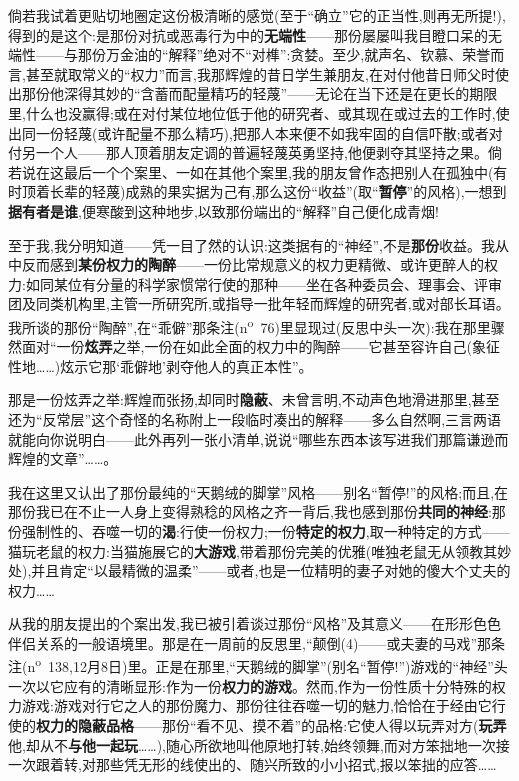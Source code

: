 倘若我试着更贴切地圈定这份极清晰的感觉(至于“确立”它的正当性,则再无所提!),得到的是这个:是那份对抗或恶毒行为中的\textbf{无端性}——那份屡屡叫我目瞪口呆的无端性——与那份万金油的“解释”绝对不“对榫”:贪婪。至少,就声名、钦慕、荣誉而言,甚至就取常义的“权力”而言,我那辉煌的昔日学生兼朋友,在对付他昔日师父时使出那份他深得其妙的“含蓄而配量精巧的轻蔑”——无论在当下还是在更长的期限里,什么也没赢得;或在对付某位地位低于他的研究者、或其现在或过去的工作时,使出同一份轻蔑(或许配量不那么精巧),把那人本来便不如我牢固的自信吓散;或者对付另一个人——那人顶着朋友定调的普遍轻蔑英勇坚持,他便剥夺其坚持之果。倘若说在这最后一个个案里、一如在其他个案里,我的朋友曾作态把别人在孤独中(有时顶着长辈的轻蔑)成熟的果实据为己有,那么这份“收益”(取“\textbf{暂停}”的风格),一想到\textbf{据有者是谁},便寒酸到这种地步,以致那份端出的“解释”自己便化成青烟!

至于我,我分明知道——凭一目了然的认识:这类据有的“神经”,不是\textbf{那份}收益。我从中反而感到\textbf{某份权力的陶醉}——一份比常规意义的权力更精微、或许更醉人的权力:如同某位有分量的科学家惯常行使的那种——坐在各种委员会、理事会、评审团及同类机构里\dmark{},主管一所研究所,或指导一批年轻而辉煌的研究者,或对部长耳语。我所谈的那份“陶醉”,在“乖僻”那条注(n\textsuperscript{o}~76)里显现过(反思中头一次):我在那里骤然面对“一份\textbf{炫弄}之举,一份在如此全面的权力中的陶醉——它甚至容许自己(象征性地……)炫示它那‘乖僻地’剥夺他人的真正本性”。

那是一份炫弄之举:辉煌而张扬,却同时\textbf{隐蔽}、未曾言明,不动声色地滑进那里,甚至还为“反常层”这个奇怪的名称附上一段临时凑出的解释——多么自然啊,三言两语就能向你说明白——此外再列一张小清单,说说“哪些东西本该写进我们那篇谦逊而辉煌的文章”……。

我在这里又认出了那份最纯的“天鹅绒的脚掌”风格——别名“暂停!”的风格;而且,在那份我已在不止一人身上变得熟稔的风格之齐一背后,我也感到那份\textbf{共同的神经}:那份强制性的、吞噬一切的\textbf{渴}:行使一份权力;一份\textbf{特定的权力},取一种特定的方式——猫玩老鼠的权力:当猫施展它的\textbf{大游戏},带着那份完美的优雅(唯独老鼠无从领教其妙处),并且肯定“以最精微的温柔”——或者,也是一位精明的妻子对她的傻大个丈夫的权力……

从我的朋友提出的个案出发,我已被引着谈过那份“风格”及其意义——在形形色色伴侣关系的一般语境里。那是在一周前的反思里,“颠倒(4)——或夫妻的马戏”那条注(n\textsuperscript{o}~138,12月8日)里。正是在那里,“天鹅绒的脚掌”(别名“暂停!”)游戏的“神经”头一次以它应有的清晰显形:作为一份\textbf{权力的游戏}。然而,作为一份性质十分特殊的权力游戏:游戏对行它之人的那份魔力、那份往往吞噬一切的魅力,恰恰在于经由它行使的\textbf{权力的隐蔽品格}——那份“看不见、摸不着”的品格:它使人得以玩弄对方(\textbf{玩弄}他,却从不\textbf{与他一起玩}……),随心所欲地叫他原地打转,始终领舞,而对方笨拙地一次接一次跟着转,对那些凭无形的线使出的、随兴所致的小小招式,报以笨拙的应答\dmark{}……

